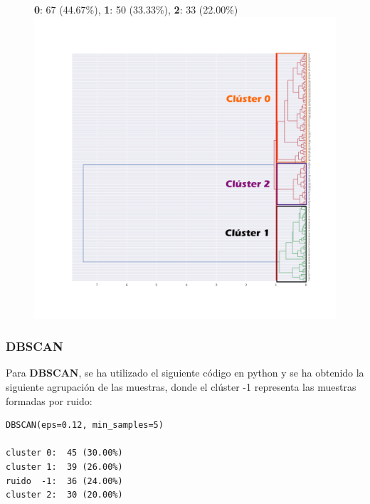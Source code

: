 \documentclass[spanish]{beamer}
\begin{document}
\begin{frame}
\begin{figure}[h]
\centering
\textbf{0}: 67 (44.67\%), \textbf{1}: 50 (33.33\%), \textbf{2}: 33 (22.00\%)
\includegraphics[scale=0.23]{dani/dendrogramcolor.png}
\end{figure}
\end{frame}


\begin{frame}[fragile]
\frametitle{DBSCAN}
Para \textbf{DBSCAN}, se ha utilizado el siguiente código en python y se ha obtenido la siguiente agrupación de las muestras, donde el clúster -1 representa las muestras formadas por ruido:\break
\begin{lstlisting}
DBSCAN(eps=0.12, min_samples=5)

cluster 0:  45 (30.00%)
cluster 1:  39 (26.00%)
ruido  -1:  36 (24.00%)
cluster 2:  30 (20.00%)
\end{lstlisting}
\end{frame}
\end{document}
